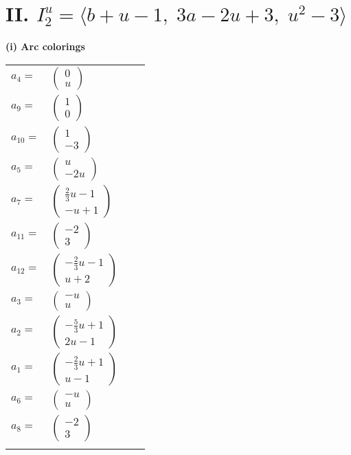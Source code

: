 \documentclass[1p]{elsarticle_modified}
\theoremstyle{definition}
\begin{document}
\centering \section*{II. $I^u_{2}= \langle b+u-1,\;3 a-2 u+3,\;u^2-3 \rangle$}
\flushleft \textbf{(i) Arc colorings}\\
\begin{tabular}{m{7pt} m{180pt} m{7pt} m{180pt} }
\flushright $a_{4}=$&$\begin{pmatrix}0\\u\end{pmatrix}$ \\
\flushright $a_{9}=$&$\begin{pmatrix}1\\0\end{pmatrix}$ \\
\flushright $a_{10}=$&$\begin{pmatrix}1\\-3\end{pmatrix}$ \\
\flushright $a_{5}=$&$\begin{pmatrix}u\\-2 u\end{pmatrix}$ \\
\flushright $a_{7}=$&$\begin{pmatrix}\frac{2}{3} u-1\\- u+1\end{pmatrix}$ \\
\flushright $a_{11}=$&$\begin{pmatrix}-2\\3\end{pmatrix}$ \\
\flushright $a_{12}=$&$\begin{pmatrix}-\frac{2}{3} u-1\\u+2\end{pmatrix}$ \\
\flushright $a_{3}=$&$\begin{pmatrix}- u\\u\end{pmatrix}$ \\
\flushright $a_{2}=$&$\begin{pmatrix}-\frac{5}{3} u+1\\2 u-1\end{pmatrix}$ \\
\flushright $a_{1}=$&$\begin{pmatrix}-\frac{2}{3} u+1\\u-1\end{pmatrix}$ \\
\flushright $a_{6}=$&$\begin{pmatrix}- u\\u\end{pmatrix}$ \\
\flushright $a_{8}=$&$\begin{pmatrix}-2\\3\end{pmatrix}$\\&\end{tabular}
\end{document}
